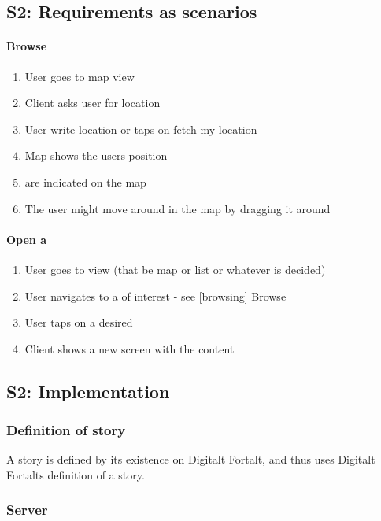 \documentclass[11pt]{book}
\begin{document}
\subsection{S2: Requirements as scenarios}
\paragraph{Browse \wallentityp}
\begin{enumerate}
    \item User goes to map view
    \item Client asks user for location
    \item User write location or taps on fetch my location
    \item Map shows the users position
    \item \wallentitypcap are indicated on the map
    \item The user might move around in the map by dragging it around
\end{enumerate}

\paragraph{Open a \wallentitys}
\begin{enumerate}
    \item User goes to \wallentityp view (that be map or list or whatever is decided)
    \item User navigates to a \wallentitys of interest - see [\wallentitys browsing] Browse \wallentityp
    \item User taps on a desired \wallentitys
    \item Client shows a new screen with the \wallentitys content
\end{enumerate}

\subsection{S2: Implementation}

\subsubsection{Definition of story}
A story is defined by its existence on Digitalt Fortalt, and thus uses Digitalt Fortalts definition of a story.

\subsubsection{Server}
\end{document}
